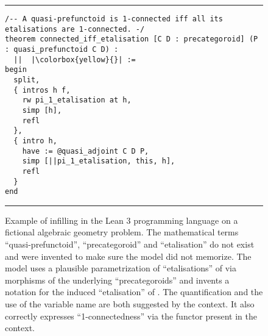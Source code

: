 \documentclass[10pt]{article}
\begin{document}
\begin{figure}[h!]
\small
\noindent\rule{\textwidth}{1pt}
\begin{verbatim}
/-- A quasi-prefunctoid is 1-connected iff all its etalisations are 1-connected. -/
theorem connected_iff_etalisation [C D : precategoroid] (P : quasi_prefunctoid C D) :
  ||  |\colorbox{yellow}{}| :=
begin
  split,
  { intros h f,
    rw pi_1_etalisation at h,
    simp [h],
    refl
  },
  { intro h,
    have := @quasi_adjoint C D P,
    simp [||pi_1_etalisation, this, h],
    refl
  }
end
\end{verbatim}

\noindent\rule{\textwidth}{1pt}
\caption{Example of infilling in the Lean 3 programming language on a fictional algebraic geometry problem. The mathematical terms  ``quasi-prefunctoid'', ``precategoroid'' and ``etalisation'' do not exist and were invented to make sure the model did not memorize. The model uses a plausible parametrization of ``etalisations'' of  via morphisms  of the underlying ``precategoroids'' and invents a notation for the induced ``etalisation'' of . The  quantification and the use of the variable name  are both suggested by the context. It also correctly expresses ``1-connectedness'' via the  functor present in the context.\label{fig:leanexample}}
\end{figure}
\end{document}

